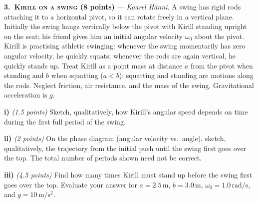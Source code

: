 \textbf{3.\ \textsc{Kirill on a swing} (8 points)} --- \textit{Kaarel Hänni.}
A swing has rigid rods attaching it to a horizontal pivot, so it can rotate
freely in a vertical plane. Initially the swing hangs vertically below the
pivot with Kirill standing upright on the seat; his friend gives him an initial
angular velocity $\omega_0$ about the pivot. Kirill is practising athletic
swinging: whenever the swing momentarily has zero angular velocity, he quickly
squats; whenever the rods are again vertical, he quickly stands up. Treat Kirill
as a point mass at distance $a$ from the pivot when standing and $b$ when
squatting ($a < b$); squatting and standing are motions along the rods. Neglect
friction, air resistance, and the mass of the swing. Gravitational acceleration
is $g$.

\textbf{i)} \textit{(1.5 points)} Sketch, qualitatively, how Kirill's angular
speed depends on time during the first full period of the swing.

\textbf{ii)} \textit{(2 points)} On the phase diagram (angular velocity vs.\
angle), sketch, qualitatively, the trajectory from the initial push until the
swing first goes over the top. The total number of periods shown need not be
correct.

\textbf{iii)} \textit{(4.5 points)} Find how many times Kirill must stand up
before the swing first goes over the top. Evaluate your answer for
$a = 2.5\,\mathrm{m}$, $b = 3.0\,\mathrm{m}$, $\omega_0 = 1.0\,\mathrm{rad/s}$,
and $g = 10\,\mathrm{m/s^2}$.
